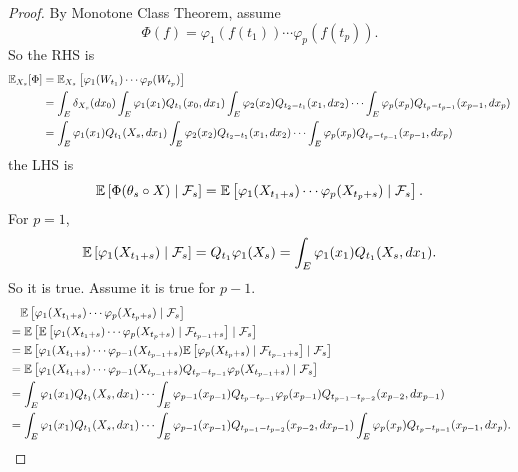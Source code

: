 \begin{proof}
    By Monotone Class Theorem, assume 
    \begin{equation*}
        \Phi(f) = \varphi_1(f(t_1))\cdots \varphi_p(f(t_p)).
    \end{equation*}
    So the RHS is
    \begin{align*}
        \mathbb{E}_{X_s}[\Phi] &= \mathbb{E}_{X_s}\left[ \varphi_1(W_{t_1})\cdots \varphi_p(W_{t_p}) \right] \\
        &= \int_E \delta_{X_s}(dx_0) \int_E \varphi_1(x_1)Q_{t_1}(x_0,dx_1)\int_E \varphi_2(x_2)Q_{t_2 - t_1}(x_1,dx_2) \cdots \int_E  \varphi_p(x_p)Q_{t_p - t_{p-1}}(x_{p-1},dx_p) \\
        &= \int_E \varphi_1(x_1)Q_{t_1}(X_s,dx_1)\int_E \varphi_2(x_2)Q_{t_2 - t_1}(x_1,dx_2) \cdots \int_E  \varphi_p(x_p)Q_{t_p - t_{p-1}}(x_{p-1},dx_p)
    \end{align*}
     the LHS is
    \begin{equation*}
        \mathbb{E}\left[\Phi(\theta_s \circ X) \mid \mathcal{F}_s\right] = \mathbb{E}\left[\varphi_1(X_{t_1 + s})\cdots \varphi_p(X_{t_p+s}) \mid \mathcal{F}_s\right].
    \end{equation*}
    For $p = 1$,
    \begin{equation*}
        \mathbb{E}\left[\varphi_1(X_{t_1 + s}) \mid \mathcal{F}_s\right] = Q_{t_1}\varphi_1(X_s) = \int_E \varphi_1(x_1)Q_{t_1}(X_s,dx_1).
    \end{equation*}
    So it is true. Assume it is true for $p-1$.
    \begin{align*}
        &\quad\mathbb{E}\left[\varphi_1(X_{t_1 + s})\cdots \varphi_p(X_{t_p+s}) \mid \mathcal{F}_s\right] \\
        &= \mathbb{E}\left[\mathbb{E}\left[\varphi_1(X_{t_1 + s})\cdots \varphi_p(X_{t_p+s}) \mid \mathcal{F}_{t_{p-1}+s}\right] \mid \mathcal{F}_s\right]\\
        &= \mathbb{E}\left[\varphi_1(X_{t_1 + s})\cdots \varphi_{p-1}(X_{t_{p-1}+s}) \mathbb{E}\left[\varphi_p(X_{t_p+s}) \mid \mathcal{F}_{t_{p-1}+s}\right] \mid \mathcal{F}_s\right]\\
        &= \mathbb{E}\left[\varphi_1(X_{t_1 + s})\cdots \varphi_{p-1}(X_{t_{p-1}+s}) Q_{t_p - t_{p-1}}\varphi_p(X_{t_{p-1}+s}) \mid \mathcal{F}_s\right] \\
        &= \int_E \varphi_1(x_1)Q_{t_1}(X_s,dx_1) \cdots \int_E  \varphi_{p-1}(x_{p-1})Q_{t_p - t_{p-1}}\varphi_p(x_{p-1})Q_{t_{p-1} - t_{p-2}}(x_{p-2},dx_{p-1}) \\
        &= \int_E \varphi_1(x_1)Q_{t_1}(X_s,dx_1) \cdots \int_E  \varphi_{p-1}(x_{p-1})Q_{t_{p-1} - t_{p-2}}(x_{p-2},dx_{p-1})\int_E \varphi_p(x_p) Q_{t_p - t_{p-1}}(x_{p-1},dx_p). \qedhere
    \end{align*}
\end{proof}

